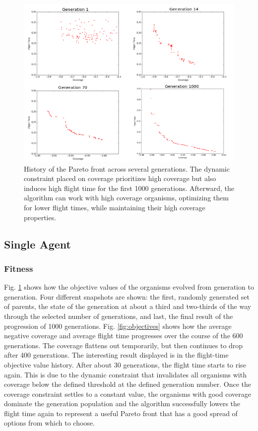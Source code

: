 \documentclass[letterpaper, 10 pt, conference]{ieeeconf}  %
\begin{document}
\begin{table}
\begin{tabular}{l|l}
\end{tabular}
\label{tab:parameters}
\end{table}

\begin{figure}
\centering
\includegraphics[width=0.8\linewidth]{pareto_history3.png}
\caption[A plot of the Pareto front across 1000 generations in the coverage planner optimization.]{History of the Pareto front across several generations. The dynamic constraint placed on coverage prioritizes high coverage but also induces high flight time for the first 1000 generations. Afterward, the algorithm can work with high coverage organisms, optimizing them for lower flight times, while maintaining their high coverage properties.}
\label{fig:pareto_cheetos}
\end{figure}

\subsection{Single Agent}
\subsubsection{Fitness}

Fig. \ref{fig:pareto_cheetos} shows how the objective values of the organisms evolved from generation to generation. Four different snapshots are shown: the first, randomly generated set of parents, the state of the generation at about a third and two-thirds of the way through the selected number of generations, and last, the final result of the progression of 1000 generations. Fig. \ref{fig:objectives} shows how the average negative coverage and average flight time progresses over the course of the 600 generations. The coverage flattens out temporarily, but then continues to drop after 400 generations. The interesting result displayed is in the flight-time objective value history. After about 30 generations, the flight time starts to rise again. This is due to the dynamic constraint that invalidates all organisms with coverage below the defined threshold at the defined generation number. Once the coverage constraint settles to a constant value, the organisms with good coverage dominate the generation population and the algorithm successfully lowers the flight time again to represent a useful Pareto front that has a good spread of options from which to choose.
\end{document}
